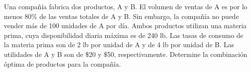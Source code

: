 \begin{frameact}{}{}
\label{act:taha_02-02A-05}
  Una compañía fabrica dos productos, A y B. El volumen de ventas de A es por lo menos 80\% de las ventas totales de A y B. Sin embargo, la compañía no puede vender más de 100 unidades de A por día. Ambos productos utilizan una materia prima, cuya disponibilidad diaria máxima es de 240 lb. Las tasas de consumo de la materia prima son de 2 lb por unidad de A y de 4 lb por unidad de B. Las utilidades de A y B son de \$20 y \$50, respectivamente. Determine la combinación óptima de productos para la compañía.
\end{frameact}


